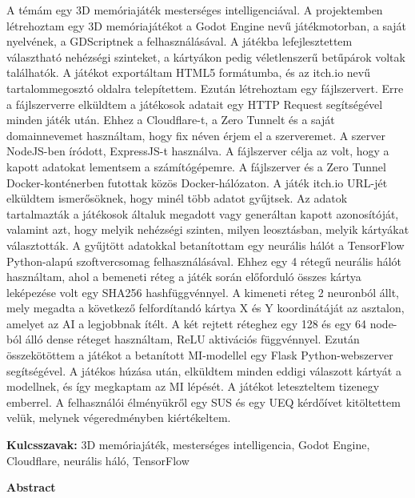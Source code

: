 A témám egy 3D memóriajáték mesterséges intelligenciával.
A projektemben létrehoztam egy 3D memóriajátékot a Godot Engine nevű játékmotorban, a saját nyelvének, a GDScriptnek a felhasználásával. A játékba lefejlesztettem választható nehézségi szinteket, a kártyákon pedig véletlenszerű betűpárok voltak találhatók.
A játékot exportáltam HTML5 formátumba, és az itch.io nevű tartalommegosztó oldalra telepítettem.
Ezután létrehoztam egy fájlszervert. Erre a fájlszerverre elküldtem a játékosok adatait egy HTTP Request segítségével minden játék után. Ehhez a Cloudflare-t, a Zero Tunnelt és a saját domainnevemet használtam, hogy fix néven érjem el a szerveremet.
A szerver NodeJS-ben íródott, ExpressJS-t használva. A fájlszerver célja az volt, hogy a kapott adatokat lementsem a számítógépemre.
A fájlszerver és a Zero Tunnel Docker-konténerben futottak közös Docker-hálózaton.
A játék itch.io URL-jét elküldtem ismerősöknek, hogy minél több adatot gyűjtsek.
Az adatok tartalmazták a játékosok általuk megadott vagy generáltan kapott azonosítóját, valamint azt, hogy melyik nehézségi szinten, milyen leosztásban, melyik kártyákat választották.
A gyűjtött adatokkal betanítottam egy neurális hálót a TensorFlow Python-alapú szoftvercsomag felhasználásával.
Ehhez egy 4 rétegű neurális hálót használtam, ahol a bemeneti réteg a játék során előforduló összes kártya leképezése volt egy SHA256 hashfüggvénnyel.
A kimeneti réteg 2 neuronból állt, mely megadta  a következő felfordítandó kártya X és Y koordinátáját az asztalon, amelyet az AI a legjobbnak ítélt.
A két rejtett réteghez egy 128 és egy 64 node-ból álló dense réteget használtam, ReLU aktivációs függvénnyel.
Ezután összekötöttem a játékot a betanított MI-modellel egy Flask Python-webszerver segítségével. A játékos húzása után, elküldtem minden eddigi válaszott kártyát a modellnek, és így megkaptam az MI lépését.
A játékot leteszteltem tizenegy emberrel. A felhasználói élményükről egy SUS és egy UEQ kérdőívet kitöltettem velük, melynek végeredményben kiértékeltem.
\vspace{8pt}



\textbf{Kulcsszavak: }3D memóriajáték, mesterséges intelligencia, Godot Engine, Cloudflare, neurális háló, TensorFlow
\newpage



\textbf{\large{Abstract}}\\[32pt]

\thispagestyle{fancy}
\pagestyle{fancy}

